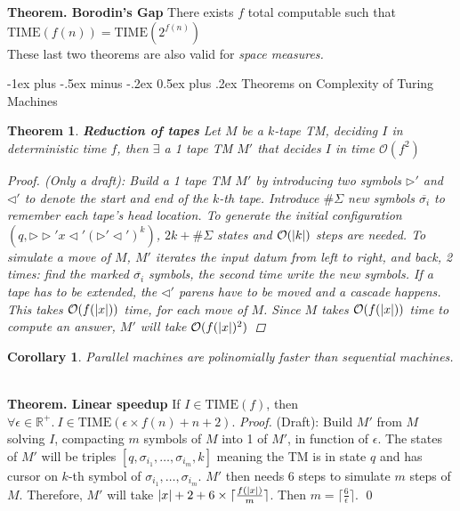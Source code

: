\documentclass[10pt,landscape]{article}
\makeatletter
\newcommand{\bumper}{\triangleright}
\newcommand{\R}{\mathbb{R}}
\renewcommand{\O}{\mathcal{O}}
\newcommand{\TIME}{\mathrm{TIME}}
\DeclarePairedDelimiter\abs{\lvert}{\rvert}
\theoremstyle{plain}%
\newtheorem*{thm}{Theorem}
\newtheorem*{cor}{Corollary}
\theoremstyle{definition}
\theoremstyle{remark}
\renewcommand{\section}{\@startsection{section}{1}{0mm}%
                                {-1ex plus -.5ex minus -.2ex}%
                                {0.5ex plus .2ex}%
                                {\normalfont\large\bfseries}}
\makeatother
\begin{document}
\begin{multicols}{4}
\textbf{Theorem. Borodin's Gap} There exists $f$ total computable such that
$\TIME(f(n)) = \TIME(2^{f(n)})$ \\[.2cm]

These last two theorems are also valid for \textit{space measures.}


\section{Theorems on Complexity of Turing Machines}


\begin{thm} \textbf{Reduction of tapes}
    Let $M$ be a $k$-tape TM, deciding $I$ in deterministic time $f$,
    then $\exists$ a 1 tape TM $M'$ that decides $I$ in time $\O(f^2)$


    \begin{proof} (Only a draft):
        Build a 1 tape TM $M'$ by introducing two symbols $\bumper'$ and
        $\triangleleft'$ to denote the start and end of the $k$-th tape.
        Introduce $\#\Sigma$ new symbols $\overline{\sigma_i}$ to remember
        each tape's head location.
        To generate the initial configuration $(q, \bumper \bumper' x \triangleleft' (\bumper' \triangleleft' )^k )$,
        $2k + \#\Sigma$ states and $\O(\abs{k})$ steps are needed.
        To simulate a move of $M$, $M'$ iterates the input datum from left to right, and back,
        2 times: find the marked $\overline{\sigma_i}$ symbols, the second time write the new
        symbols. If a tape has to be extended, the $\triangleleft'$ parens have to be moved 
        and a cascade happens. This takes $\O(f(\abs{x}))$ time, for each move of $M$. Since
        $M$ takes $\O(f(\abs{x}))$ time to compute an answer, $M'$ will take $\O(f(\abs{x})^2)$
    \end{proof}
\end{thm}

\begin{cor}
    Parallel machines are polinomially faster than sequential machines.
\end{cor}

 \\[.2cm]


\textbf{Theorem. Linear speedup}
If $I \in \TIME(f)$, then $\forall \epsilon \in \R^+  . \ I \in \TIME(\epsilon \times f(n) + n + 2)$.
\textit{Proof.}
        (Draft): Build $M'$ from $M$ solving $I$, compacting $m$ symbols of $M$ into 1 of $M'$, in function of $\epsilon$.
        The states of $M'$ will be triples $[q,\sigma_{i_1},\hdots,\sigma_{i_m},k]$ meaning the TM is in state $q$
        and has cursor on $k$-th symbol of $\sigma_{i_1},\hdots,\sigma_{i_m}$. $M'$ then needs 6 steps to simulate
        $m$ steps of $M$. Therefore, $M'$ will take $\abs{x} + 2 + 6 \times \lceil \frac{f(\abs{x})}{m}\rceil$. 
        Then $m = \lceil \frac{6}{\epsilon} \rceil$.
        \qed \\[.2cm]


\end{multicols}
\end{document}
